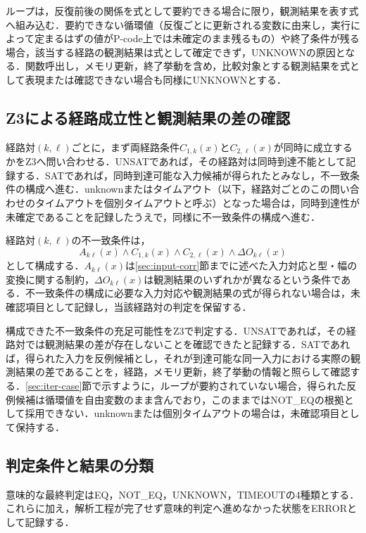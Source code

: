 ループは，反復前後の関係を式として要約できる場合に限り，観測結果を表す式へ組み込む．要約できない循環値（反復ごとに更新される変数に由来し，実行によって定まるはずの値がP-code上では未確定のまま残るもの）や終了条件が残る場合，該当する経路の観測結果は式として確定できず，UNKNOWNの原因となる．関数呼出し，メモリ更新，終了挙動を含め，比較対象とする観測結果を式として表現または確認できない場合も同様にUNKNOWNとする．

\subsection{Z3による経路成立性と観測結果の差の確認}\label{sec:z3-check}
経路対$(k,\ell)$ごとに，まず両経路条件$C_{1,k}(x)$と$C_{2,\ell}(x)$が同時に成立するかをZ3へ問い合わせる．UNSATであれば，その経路対は同時到達不能として記録する．SATであれば，同時到達可能な入力候補が得られたとみなし，不一致条件の構成へ進む．unknownまたはタイムアウト（以下，経路対ごとのこの問い合わせのタイムアウトを個別タイムアウトと呼ぶ）となった場合は，同時到達性が未確定であることを記録したうえで，同様に不一致条件の構成へ進む．

経路対$(k,\ell)$の不一致条件は，
\[
  A_{k\ell}(x) \land C_{1,k}(x) \land C_{2,\ell}(x) \land \Delta O_{k\ell}(x)
\]
として構成する．$A_{k\ell}(x)$は\ref{sec:input-corr}節までに述べた入力対応と型・幅の変換に関する制約，$\Delta O_{k\ell}(x)$は観測結果のいずれかが異なるという条件である．不一致条件の構成に必要な入力対応や観測結果の式が得られない場合は，未確認項目として記録し，当該経路対の判定を保留する．

構成できた不一致条件の充足可能性をZ3で判定する．UNSATであれば，その経路対では観測結果の差が存在しないことを確認できたと記録する．SATであれば，得られた入力を反例候補とし，それが到達可能な同一入力における実際の観測結果の差であることを，経路，メモリ更新，終了挙動の情報と照らして確認する．\ref{sec:iter-case}節で示すように，ループが要約されていない場合，得られた反例候補は循環値を自由変数のまま含んでおり，このままではNOT\_EQの根拠として採用できない．unknownまたは個別タイムアウトの場合は，未確認項目として保持する．

\subsection{判定条件と結果の分類}\label{sec:decision-results}
意味的な最終判定はEQ，NOT\_EQ，UNKNOWN，TIMEOUTの4種類とする．これらに加え，解析工程が完了せず意味的判定へ進めなかった状態をERRORとして記録する．

